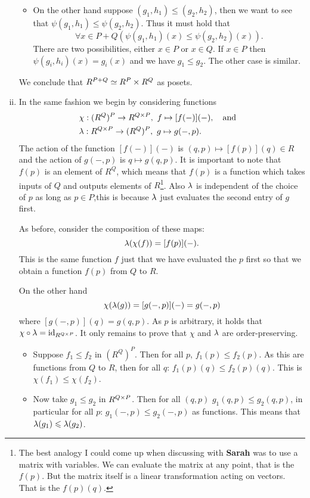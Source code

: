 \documentclass[12pt]{memoir}
\begin{document}
\begin{ptcbr}
\begin{enumerate}[i)]
\begin{itemize}
        \item On the other hand suppose $(g_1,h_1)\leq(g_2,h_2)$, then we want to see that $\psi(g_1,h_1)\leq\psi(g_2,h_2)$. Thus it must hold that 
        $$\forall x\in P+Q(\psi(g_1,h_1)(x)\leq\psi(g_2,h_2)(x)).$$
        There are two possibilities, either $x\in P$ or $x\in Q$. If $x\in P$ then $\psi(g_i,h_i)(x)=g_i(x)$ and we have $g_1\leq g_2$. The other case is similar.
    \end{itemize}
    We conclude that $R^{P+Q}\simeq R^P\times R^Q$ as posets.
    \item In the same fashion we begin by considering functions
    \begin{align*}
        &\chi: (R^Q)^P\to R^{Q\times P},\ f\mapsto [f(-)](-),\quad\text{and}\quad\\
        &\lambda: R^{Q\times P}\to (R^Q)^P,\ g\mapsto g(-,p).
    \end{align*}
    The action of the function $[f(-)](-)$ is $(q,p)\mapsto [f(p)](q)\in R$ and the action of $g(-,p)$ is $q\mapsto g(q,p)$. It is important to note that $f(p)$ is an element of $R^Q$, which means that $f(p)$ is a function which takes inputs of $Q$ and outputs elements of $R$\footnote{The best analogy I could come up when discussing with \textbf{Sarah} was to use a matrix with variables. We can evaluate the matrix at any point, that is the $f(p)$. But the matrix itself is a linear transformation acting on vectors. That is the $f(p)(q)$.}. Also $\lambda$ is independent of the choice of $p$ as long as $p\in P$,this is because $\lambda$ just evaluates the second entry of $g$ first.\par 
    As before, consider the composition of these maps:
    $$\lambda(\chi(f))=[f(p)](-).$$
    This is the same function $f$ just that we have evaluated the $p$ first so that we obtain a function $f(p)$ from $Q$ to $R$.\par 
    On the other hand 
    $$\chi(\lambda(g))=[g(-,p)](-)=g(-,p)$$
    where $[g(-,p)](q)=g(q,p)$. As $p$ is arbitrary, it holds that $\chi\circ\lambda=\operatorname{id}_{R^{Q\times P}}$. It only remains to prove that $\chi$ and $\lambda$ are order-preserving.
    \begin{itemize}
        \itemsep=-0.4em
        \item Suppose $f_1\leq f_2$ in $(R^Q)^P$. Then for all $p$, $f_1(p)\leq f_2(p)$. As this are functions from $Q$ to $R$, then for all $q$: $f_1(p)(q)\leq f_2(p)(q)$. This is $\chi(f_1)\leq\chi(f_2)$.
        \item Now take $g_1\leq g_2$ in $R^{Q\times P}$. Then for all $(q,p)$ $g_1(q,p)\leq g_2(q,p)$, in particular for all $p$: $g_1(-,p)\leq g_2(-,p)$ as functions. This means that $\lambda(g_1)\leqslant\lambda(g_2)$.
    \end{itemize}
\end{enumerate} 
\end{ptcbr}
\end{document}
